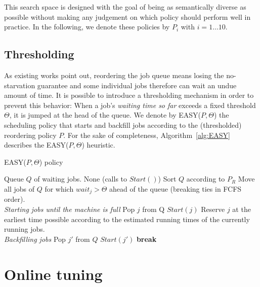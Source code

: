 \documentclass[sigconf,review]{acmart}
\begin{document}
This search space is designed with the goal of being as semantically diverse as
possible without making any judgement on which policy should perform well in
practice. In the following, we denote these policies by $P_i$ with $i = 1
\ldots 10$.

\subsection{Thresholding}
\label{sub:th}
As existing works point out, reordering the job queue means losing the
no-starvation guarantee and some individual jobs therefore can wait an undue
amount of time. It is possible to introduce a thresholding mechanism in order
to prevent this behavior: When a job's \textit{waiting time so far} exceeds a
fixed threshold $\Theta$, it is jumped at the head of the queue. We denote by
EASY($P,\Theta$) the scheduling policy that starts and backfill jobs according to
the (thresholded) reordering policy $P$. For the sake of completeness,
Algorithm~\ref{alg:EASY} describes the EASY($P,\Theta$) heuristic.

\begin{algorithm}[h]
  \caption{EASY($P,\Theta$) policy}
  \begin{algorithmic}[1]
    \renewcommand{\algorithmicrequire}{\textbf{Input:}}
    \renewcommand{\algorithmicensure}{\textbf{Output:}}
    \REQUIRE Queue $Q$ of waiting jobs.
    \ENSURE None (calls to $Start()$)
    \STATE Sort $Q$ according to $P_R$
    \STATE Move all jobs of $Q$ for which $wait_j > \Theta$ ahead
    of the queue (breaking ties in FCFS order).
    \\ \textit{Starting jobs until the machine is full}
    \STATE Pop $j$ from Q
    \STATE $Start(j)$
    \ELSE
    \STATE Reserve $j$ at the earliest
    time possible according to the estimated running times
    of the currently running jobs.
    \\ \textit{Backfilling jobs}
    \STATE Pop $j'$ from $Q$
    \STATE $Start(j')$
    \ENDIF
    \ENDFOR
    \STATE \textbf{break}
    \ENDIF
    \ENDFOR
  \end{algorithmic}
  \label{alg:EASY}
\end{algorithm}


\section{Online tuning}
\label{sec:online}
\end{document}
